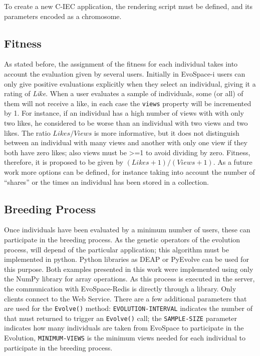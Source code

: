 \documentclass{sig-alternate}
\begin{document}
To create a new C-IEC application, the  rendering script must be defined, and its parameters encoded as a chromosome.


\subsection{Fitness}
As stated before, the assignment of the fitness for each individual takes into account the evaluation given by several users. Initially in EvoSpace-i users can only give positive evaluations explicitly when they select an individual, giving it a rating of \emph{Like}.
When a user evaluates a sample of individuals, some (or all) of them will not receive a like, in each case the \texttt{views} property will be incremented by 1. For instance, if an individual has a high number of views with with only two likes, he considered to be  worse than an individual with two views and two likes. The ratio $Likes/Views$ is more informative, but it does not distinguish between an individual with many views and another with only
one view if they both have zero likes; also views must be >=1 to avoid dividing by zero. Fitness, therefore, it is proposed to be given by $(Likes+1)/(Views+1)$. As a future work more options can be defined, for instance taking into account the number of ``shares'' or the times an individual has been stored in a collection.

\subsection{Breeding Process}

Once individuals have been evaluated by a minimum number of users, these can participate in the breeding process. As the genetic operators of the evolution process, will depend of the particular application; this algorithm must be implemented in python. Python libraries as DEAP or PyEvolve can be used for this purpose. Both examples presented in this work were implemented using only the NumPy library for array operations. As this process is executed in the server, the communication with EvoSpace-Redis is directly through a library. Only clients connect to the Web Service. There are a few additional parameters that are used for the \texttt{Evolve()} method: \texttt{EVOLUTION-INTERVAL} indicates the number of that must returned to trigger an \texttt{Evolve()} call; the  \texttt{SAMPLE-SIZE} parameter indicates how many individuals are taken from EvoSpace to participate in the Evolution, \texttt{MINIMUM-VIEWS} is the minimum views needed for each individual to participate in the breeding process.
\end{document}
